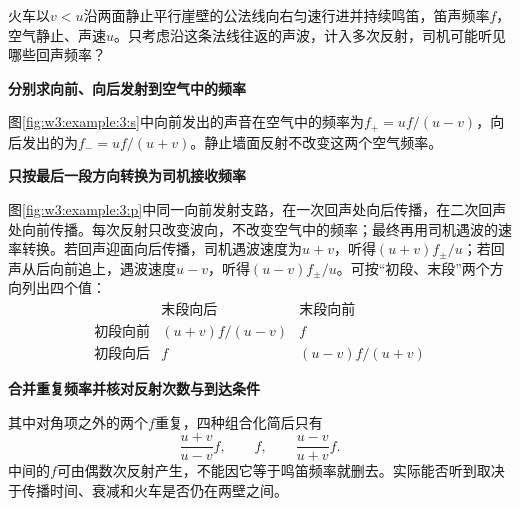 \begin{question}\begin{example}[两崖之间的火车回声]\label{w3:example:3}
火车以$v<u$沿两面静止平行崖壁的公法线向右匀速行进并持续鸣笛，笛声频率$f$，空气静止、声速$u$。只考虑沿这条法线往返的声波，计入多次反射，司机可能听见哪些回声频率？
\end{example}
\end{question}
\begin{solution}\textbf{分别求向前、向后发射到空气中的频率}\par\nobreak
图\ref{fig:w3:example:3:s}中向前发出的声音在空气中的频率为$f_+=uf/(u-v)$，向后发出的为$f_-=uf/(u+v)$。静止墙面反射不改变这两个空气频率。



\par\medskip{}\noindent\textbf{只按最后一段方向转换为司机接收频率}\par\nobreak
图\ref{fig:w3:example:3:p}中同一向前发射支路，在一次回声处向后传播，在二次回声处向前传播。每次反射只改变波向，不改变空气中的频率；最终再用司机遇波的速率转换。若回声迎面向后传播，司机遇波速度为$u+v$，听得$(u+v)f_\pm/u$；若回声从后向前追上，遇波速度$u-v$，听得$(u-v)f_\pm/u$。可按“初段、末段”两个方向列出四个值：
\[
\begin{array}{c|cc}
 &\text{末段向后}&\text{末段向前}\\ \hline
\text{初段向前}&(u+v)f/(u-v)&f\\
\text{初段向后}&f&(u-v)f/(u+v)
\end{array}
\]


\par\medskip{}\noindent\textbf{合并重复频率并核对反射次数与到达条件}\par\nobreak
其中对角项之外的两个$f$重复，四种组合化简后只有
\[
\frac{u+v}{u-v}f,\qquad f,\qquad \frac{u-v}{u+v}f.
\]
中间的$f$可由偶数次反射产生，不能因它等于鸣笛频率就删去。实际能否听到取决于传播时间、衰减和火车是否仍在两壁之间。\end{solution}
